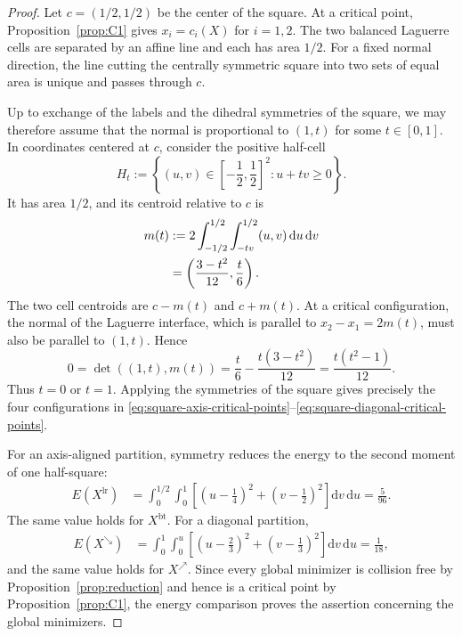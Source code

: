 \documentclass[11pt]{article}
\newcommand{\dd}{\mathrm{d}}
\theoremstyle{definition}
\theoremstyle{remark}
\numberwithin{equation}{section}
\begin{document}
\begin{proof}
Let $c=(1/2,1/2)$ be the center of the square.  At a critical point,
Proposition~\ref{prop:C1} gives $x_i=c_i(X)$ for $i=1,2$.  The two balanced Laguerre cells are
separated by an affine line and each has area $1/2$.  For a fixed normal direction, the line cutting
the centrally symmetric square into two sets of equal area is unique and passes through $c$.

Up to exchange of the labels and the dihedral symmetries of the square, we may therefore assume
that the normal is proportional to $(1,t)$ for some $t\in[0,1]$.  In coordinates centered at $c$,
consider the positive half-cell
\[
 H_t
 :=
 \left\{(u,v)\in\left[-\frac12,\frac12\right]^2:
 u+tv\ge0\right\}.
\]
It has area $1/2$, and its centroid relative to $c$ is
\begin{align}
 m(t)
 &:=2\int_{-1/2}^{1/2}\int_{-tv}^{1/2}(u,v)\,\dd u\,\dd v
 \notag\\
 &=\left(\frac{3-t^2}{12},\frac{t}{6}\right).
 \label{eq:half-square-centroid}
\end{align}
The two cell centroids are $c-m(t)$ and $c+m(t)$.  At a critical configuration, the normal of the
Laguerre interface, which is parallel to $x_2-x_1=2m(t)$, must also be parallel to $(1,t)$.  Hence
\[
 0
 =\det\!\left((1,t),m(t)\right)
 =\frac{t}{6}-\frac{t(3-t^2)}{12}
 =\frac{t(t^2-1)}{12}.
\]
Thus $t=0$ or $t=1$.  Applying the symmetries of the square gives precisely the four configurations
in \eqref{eq:square-axis-critical-points}--\eqref{eq:square-diagonal-critical-points}.

For an axis-aligned partition, symmetry reduces the energy to the second moment of one half-square:
\begin{align*}
 E(X^{\mathrm{lr}})
 &=\int_0^{1/2}\int_0^1
 \left[\left(u-\frac14\right)^2+
       \left(v-\frac12\right)^2\right]\dd v\,\dd u
 =\frac{5}{96}.
\end{align*}
The same value holds for $X^{\mathrm{bt}}$.  For a diagonal partition,
\begin{align*}
 E(X^{\searrow})
 &=\int_0^1\int_0^u
 \left[\left(u-\frac23\right)^2+
       \left(v-\frac13\right)^2\right]\dd v\,\dd u
 =\frac1{18},
\end{align*}
and the same value holds for $X^{\nearrow}$.  Since every global minimizer is collision free by
Proposition~\ref{prop:reduction} and hence is a critical point by Proposition~\ref{prop:C1}, the
energy comparison proves the assertion concerning the global minimizers.


\end{proof}
\end{document}
